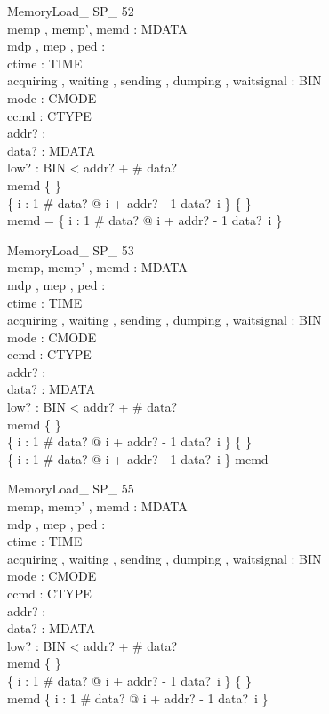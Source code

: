 \begin{schema}{MemoryLoad\_ SP\_ 52}\\
 memp , memp', memd : \seq MDATA \\
 mdp , mep , ped : \nat \\
 ctime : TIME \\
 acquiring , waiting , sending , dumping , waitsignal : BIN \\
 mode : CMODE \\
 ccmd : CTYPE \\
 addr? : \nat \\
 data? : \seq MDATA \\
 low? : BIN 
 < addr? + \# data? \\
 memd \neq \{ \} \\
 \{ i : 1 \upto \# data? @ i + addr? - 1 \mapsto data?~i \} \neq \{ \} \\
 \dom memd = \dom \{ i : 1 \upto \# data? @ i + addr? - 1 \mapsto data?~i \}
\end{schema}


\begin{schema}{MemoryLoad\_ SP\_ 53}\\
 memp, memp' , memd : \seq MDATA \\
 mdp , mep , ped : \nat \\
 ctime : TIME \\
 acquiring , waiting , sending , dumping , waitsignal : BIN \\
 mode : CMODE \\
 ccmd : CTYPE \\
 addr? : \nat \\
 data? : \seq MDATA \\
 low? : BIN 
 < addr? + \# data? \\
 memd \neq \{ \} \\
 \{ i : 1 \upto \# data? @ i + addr? - 1 \mapsto data?~i \} \neq \{ \} \\
 \dom \{ i : 1 \upto \# data? @ i + addr? - 1 \mapsto data?~i \} \subset \dom memd
\end{schema}


\begin{schema}{MemoryLoad\_ SP\_ 55}\\
 memp, memp' , memd : \seq MDATA \\
 mdp , mep , ped : \nat \\
 ctime : TIME \\
 acquiring , waiting , sending , dumping , waitsignal : BIN \\
 mode : CMODE \\
 ccmd : CTYPE \\
 addr? : \nat \\
 data? : \seq MDATA \\
 low? : BIN 
 < addr? + \# data? \\
 memd \neq \{ \} \\
 \{ i : 1 \upto \# data? @ i + addr? - 1 \mapsto data?~i \} \neq \{ \} \\
 \dom memd \subset \dom \{ i : 1 \upto \# data? @ i + addr? - 1 \mapsto data?~i \}
\end{schema}


